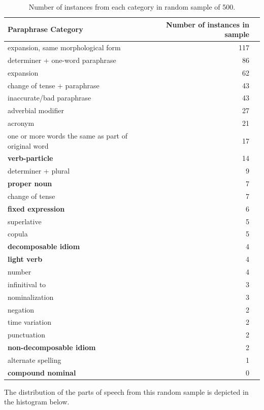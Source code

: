 \documentclass[11pt]{article}
\begin{document}
\begin{table}[h]
\begin{center}
\begin{tabular}{|l|rl|}
\hline \bf Paraphrase Category & \bf Number of instances in sample & \\ \hline
expansion, same morphological form & 117 &\\
determiner + one-word paraphrase & 86 &\\
expansion & 62 &\\
change of tense + paraphrase & 43 &\\
inaccurate/bad paraphrase & 43 &\\
adverbial modifier& 27 &\\
acronym & 21 &\\
one or more words the same as part of original word & 17 &\\
\bf verb-particle & 14  &\\
determiner + plural & 9 &\\
\bf proper noun & 7 &\\
change of tense & 7 &\\
\bf fixed expression & 6 &\\
superlative & 5 &\\
copula & 5 &\\
\bf decomposable idiom & 4 &\\
\bf light verb & 4  &\\
number & 4 &\\
infinitival to & 3 &\\
nominalization & 3 &\\
negation & 2 &\\
time variation & 2 &\\
punctuation & 2 &\\
\bf non-decomposable idiom & 2 &\\
alternate spelling & 1 &\\
\bf compound nominal & 0 &\\
\hline
\end{tabular}
\end{center}
\caption{\label{font-table} Number of instances from each category in random sample of 500. }
\end{table}

The distribution of the parts of speech from this random sample is depicted in the histogram below. 
\end{document}
